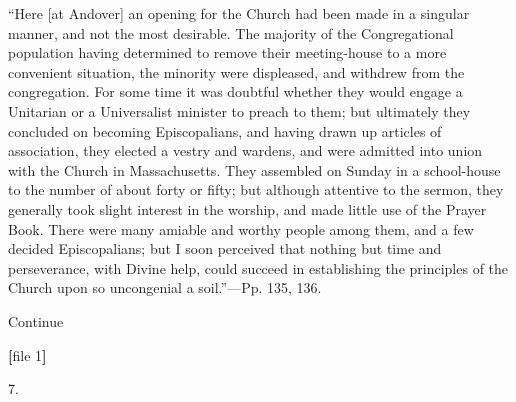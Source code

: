 ``Here
[at Andover] an opening for the Church had been made in a singular
manner, and not the most desirable. The majority of the Congregational
population having determined to remove their meeting-house to a more
convenient situation, the minority were displeased, and withdrew from
the congregation. For some time it was doubtful whether they would
engage a Unitarian or a Universalist minister to preach to them; but ultimately they concluded on becoming
Episcopalians, and having drawn up articles of association, they
elected a vestry and wardens, and were admitted into union with the
Church in Massachusetts. They assembled on Sunday in a school-house to
the number of about forty or fifty; but although attentive to the
sermon, they generally took slight interest in the worship, and made
little use of the Prayer Book. There were many amiable and worthy
people among them, and a few decided Episcopalians; but I soon
perceived that nothing but time and perseverance, with Divine help,
could succeed in establishing the principles of the Church upon so
uncongenial a soil.''—Pp. 135, 136.

Continue


\textbf{[}file
1\textbf{]}

7.


